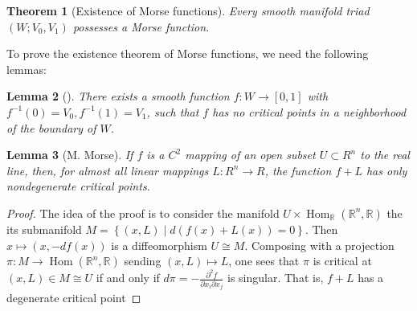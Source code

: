\documentclass[reqno]{amsart}
\newtheorem{theorem}{Theorem}[section]
\newtheorem{lemma}[theorem]{Lemma}
\theoremstyle{definition}
\theoremstyle{remark}
\DeclareMathOperator{\Hom}{Hom}
\begin{document}
   \begin{theorem}[Existence of
       Morse functions]\label{Existence-of-Morse-functions}
       Every smooth manifold triad
       $\left( W;V_0,V_1 \right) $ possesses
       a Morse function.
   \end{theorem}

   To prove the existence theorem of Morse functions, 
   we need the following lemmas:

   \begin{lemma}[]
       There exists a smooth function
       $f \colon W \to \left[ 0,1 \right] $ with
       $f^{-1}(0) = V_0, f^{-1}(1) = V_1$, such that
       $f$ has no critical points in a neighborhood
       of the boundary of $W$.
   \end{lemma}

   \begin{lemma}[M. Morse]
       If $f$ is a $C^2$ mapping of an open subset
       $U \subset R^{n}$ to the real line, then,
       for almost all linear mappings
       $L \colon R^{n} \to R$, the function
       $f + L$ has only nondegenerate critical
       points.
   \end{lemma}

   \begin{proof}
       The idea of the proof is
       to consider the manifold
       $U \times \Hom_{\mathbb{R}} \left( \mathbb{R}^{n},
       \mathbb{R} \right) $ the its submanifold
       $M = 
       \left\{ \left( x,L \right)  \mid 
       d\left( f(x) + L(x) \right) = 0\right\} $.
       Then $x\mapsto \left( x,-df(x) \right) $ is
       a diffeomorphism $U \cong M$. Composing with
       a projection $\pi \colon M \to \Hom\left( \mathbb{R}^{n},
       \mathbb{R}\right) $ sending
       $\left( x,L \right) \mapsto L$, one sees that
       $\pi$ is critical at $\left( x,L \right) \in M
       \cong U$ 
       if and only if
       $d\pi = - \frac{\partial^2 f}{\partial x_i 
       \partial x_j}$ is singular. That is, 
       $f + L$ has a degenerate critical point
   \end{proof}
        

\printbibliography
\end{document}
